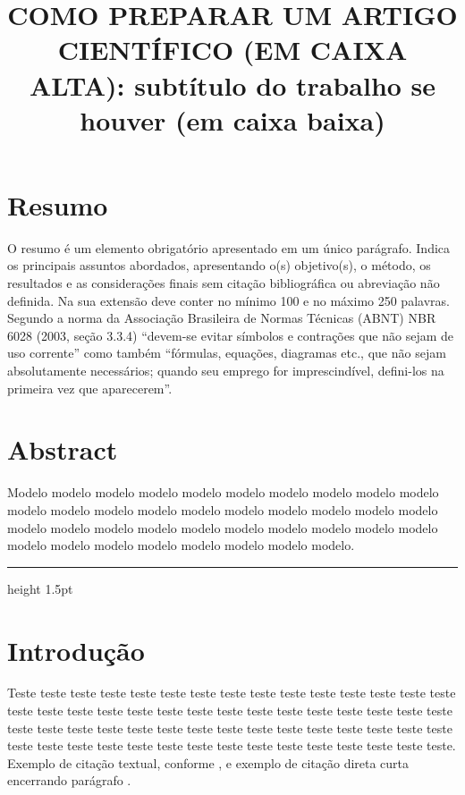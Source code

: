 \documentclass[12pt]{article}
\title{COMO PREPARAR UM ARTIGO CIENTÍFICO (EM CAIXA ALTA): subtítulo do trabalho se houver (em caixa baixa)}
\begin{document}
\maketitle

\thispagestyle{plain}

\section*{Resumo}

\noindent O resumo é um elemento obrigatório apresentado em um único parágrafo. Indica os principais assuntos abordados, apresentando o(s) objetivo(s), o método, os resultados e as considerações finais sem citação bibliográfica ou abreviação não definida. Na sua extensão deve conter no mínimo 100 e no máximo 250 palavras. Segundo a norma da Associação Brasileira de Normas Técnicas (ABNT) NBR 6028 (2003, seção 3.3.4) ``devem-se evitar símbolos e contrações que não sejam de uso corrente'' como também ``fórmulas, equações, diagramas etc., que não sejam absolutamente necessários; quando seu emprego for imprescindível, defini-los na primeira vez que aparecerem''. 


\section*{Abstract}

\noindent Modelo modelo modelo modelo modelo modelo modelo modelo modelo modelo modelo modelo modelo modelo modelo modelo modelo modelo modelo modelo modelo modelo modelo modelo modelo modelo modelo modelo modelo modelo modelo modelo modelo modelo modelo modelo modelo modelo.


\vspace*{20pt} \hrule height 1.5pt

\section{Introdução}

Teste teste teste teste teste teste teste teste teste teste teste teste teste teste teste teste teste teste teste teste teste teste teste teste teste teste teste teste teste teste teste teste teste teste teste teste teste teste teste teste teste teste teste teste teste teste teste teste teste teste teste teste teste teste teste teste teste teste teste teste. Exemplo de citação textual, conforme \textcite{world2023}, e exemplo de citação direta curta encerrando parágrafo \parencite{world2023}.
\end{document}
